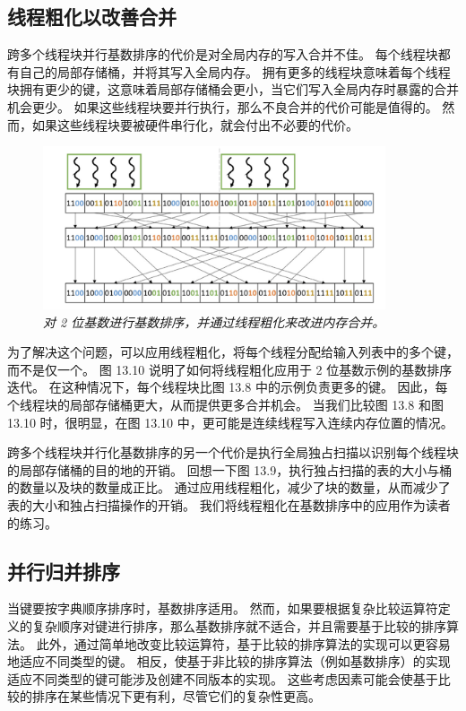\subsection{线程粗化以改善合并}
跨多个线程块并行基数排序的代价是对全局内存的写入合并不佳。 每个线程块都有自己的局部存储桶，并将其写入全局内存。 
拥有更多的线程块意味着每个线程块拥有更少的键，这意味着局部存储桶会更小，当它们写入全局内存时暴露的合并机会更少。 
如果这些线程块要并行执行，那么不良合并的代价可能是值得的。 然而，如果这些线程块要被硬件串行化，就会付出不必要的代价。

\begin{figure}[H]
	\centering
	\includegraphics[width=0.9\textwidth]{figs/F13.10.png}
	\caption{\textit{对 2 位基数进行基数排序，并通过线程粗化来改进内存合并。}}
\end{figure}

为了解决这个问题，可以应用线程粗化，将每个线程分配给输入列表中的多个键，而不是仅一个。 
图 13.10 说明了如何将线程粗化应用于 2 位基数示例的基数排序迭代。 
在这种情况下，每个线程块比图 13.8 中的示例负责更多的键。 因此，每个线程块的局部存储桶更大，从而提供更多合并机会。 
当我们比较图 13.8 和图 13.10 时，很明显，在图 13.10 中，更可能是连续线程写入连续内存位置的情况。

跨多个线程块并行化基数排序的另一个代价是执行全局独占扫描以识别每个线程块的局部存储桶的目的地的开销。 
回想一下图 13.9，执行独占扫描的表的大小与桶的数量以及块的数量成正比。 
通过应用线程粗化，减少了块的数量，从而减少了表的大小和独占扫描操作的开销。 我们将线程粗化在基数排序中的应用作为读者的练习。

\subsection{并行归并排序}
当键要按字典顺序排序时，基数排序适用。 
然而，如果要根据复杂比较运算符定义的复杂顺序对键进行排序，那么基数排序就不适合，并且需要基于比较的排序算法。 
此外，通过简单地改变比较运算符，基于比较的排序算法的实现可以更容易地适应不同类型的键。 
相反，使基于非比较的排序算法（例如基数排序）的实现适应不同类型的键可能涉及创建不同版本的实现。 
这些考虑因素可能会使基于比较的排序在某些情况下更有利，尽管它们的复杂性更高。

